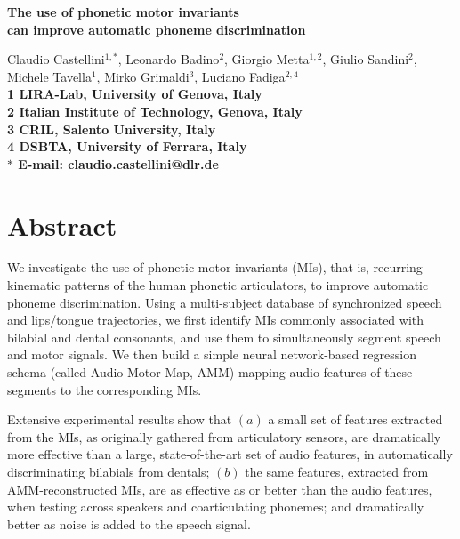 \documentclass[10pt]{article}
\date{}
\begin{document}
\begin{flushleft}
{\Large
\textbf{The use of phonetic motor invariants\\
can improve automatic phoneme discrimination}
}



Claudio Castellini$^{1,\ast}$,
Leonardo Badino$^{2}$,
Giorgio Metta$^{1,2}$,
Giulio Sandini$^{2}$,
Michele Tavella$^{1}$,
Mirko Grimaldi$^{3}$,
Luciano Fadiga$^{2,4}$
\\ 
\bf{1} LIRA-Lab, University of Genova, Italy
\\
\bf{2} Italian Institute of Technology, Genova, Italy
\\
\bf{3} CRIL, Salento University, Italy
\\
\bf{4} DSBTA, University of Ferrara, Italy
\\
$\ast$ E-mail: claudio.castellini@dlr.de
\end{flushleft}

\section*{Abstract}

 We investigate the use of phonetic motor invariants (MIs),
  that is, recurring kinematic patterns of the human phonetic articulators,
  to improve automatic phoneme discrimination. Using a multi-subject
  database of synchronized speech and lips/tongue trajectories, we first
  identify MIs commonly associated with bilabial and dental consonants,
  and use them to simultaneously segment speech and motor signals.
  We then build a simple neural network-based regression schema (called Audio-Motor
  Map, AMM) mapping audio features of these segments to the corresponding
  MIs.
  
  Extensive experimental results show that
  $(a)$ a small set of features extracted from the MIs, as originally gathered from
    articulatory sensors, are dramatically more effective than a large, state-of-the-art
    set of audio features, in automatically discriminating bilabials from dentals;
  $(b)$ the same features, extracted from AMM-reconstructed MIs, are as effective as
  or better than the audio features, when testing across speakers and coarticulating phonemes;
    and dramatically better as noise is added to the speech signal.
  
\end{document}
